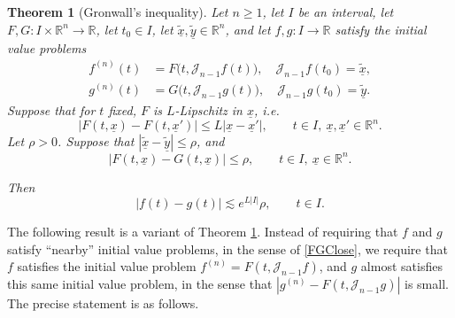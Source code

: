 \documentclass[letterpaper, reqno,11pt]{article}
\numberwithin{equation}{section}
\newcommand{\RR}{\mathbb{R}}
\newtheorem{thm}{Theorem}
\numberwithin{thm}{section}
\theoremstyle{remark}
\begin{document}
\begin{thm}[Gronwall's inequality]\label{gronwallThm}
Let $n\geq 1$, let $I$ be an interval, let $F,G\colon I\times \RR^n\to\RR$, let $t_0\in I$, let $\tilde{\underline x}, \tilde{\underline y} \in \RR^n$, and let $f,g\colon I\to\RR$ satisfy the initial value problems
\begin{equation}
\begin{split}
f^{(n)}(t) &=  F\big(t, \mathcal{J}_{n-1}f(t)\big), \quad \mathcal{J}_{n-1}f(t_0) = \tilde{\underline x},\\
g^{(n)}(t) &=  G\big(t, \mathcal{J}_{n-1}g(t)\big), \quad \mathcal{J}_{n-1}g(t_0) = \tilde{\underline y}.
\end{split}
\end{equation}
Suppose that for $t$ fixed, $F$ is $L$-Lipschitz in $\underline x$, i.e.
\[
|F(t, \underline x)-F(t, \underline x')|\leq L|\underline x-\underline x'|,\qquad t\in I,\ \underline x, \underline x'\in \RR^n.
\]
Let $\rho>0$. Suppose that $|\tilde{\underline x}-\tilde{\underline y}|\leq\rho$, and 
\begin{equation}\label{FGClose}
|F(t, \underline x) - G(t, \underline x)|\leq \rho,\qquad t\in I,\ \underline x\in \RR^n.
\end{equation}

Then
\[
|f(t)-g(t)|\lesssim e^{L|I|}\rho,\qquad t\in I.
\]
\end{thm}


The following result is a variant of Theorem \ref{gronwallThm}. Instead of requiring that $f$ and $g$ satisfy ``nearby'' initial value problems, in the sense of \eqref{FGClose}, we require that $f$ satisfies the initial value problem $f^{(n)}=F(t,\mathcal{J}_{n-1}f)$, and $g$ almost satisfies this same initial value problem, in the sense that $|g^{(n)}-F(t,\mathcal{J}_{n-1}g)|$ is small. The precise statement is as follows. 
\end{document}
